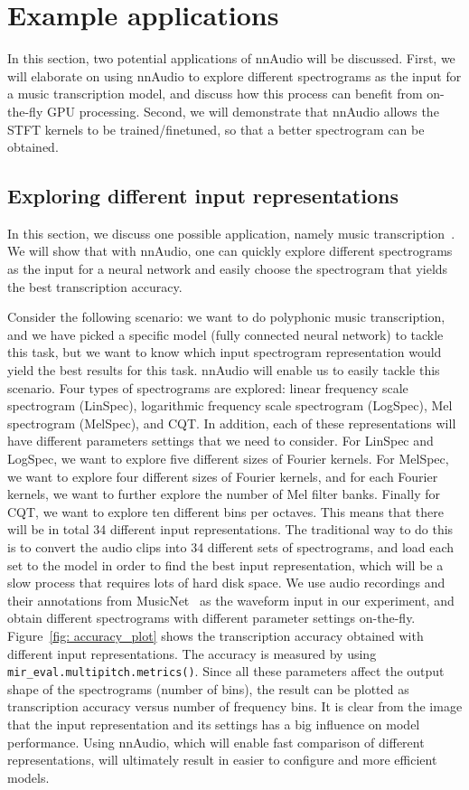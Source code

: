 \documentclass{ieeeaccess}
\newcommand{\nbh}[1]{\texttt{#1}}
\begin{document}
\section{Example applications}
In this section, two potential applications of nnAudio will be discussed. First, we will elaborate on using nnAudio to explore different spectrograms as the input for a music transcription model, and discuss how this process can benefit from on-the-fly GPU processing. Second, we will demonstrate that nnAudio allows the STFT kernels to be trained/finetuned, so that a better spectrogram can be obtained.


\subsection{Exploring different input representations}
In this section, we discuss one possible application, namely music transcription~\cite{benetos2013automatic, holzapfel2019automatic}. We will show that with nnAudio, one can quickly explore different spectrograms as the input for a neural network and easily choose the spectrogram that yields the best transcription accuracy.

Consider the following scenario: we want to do polyphonic music transcription, and we have picked a specific model (fully connected neural network) to tackle this task, but we want to know which input spectrogram representation would yield the best results for this task. nnAudio will enable us to easily tackle this scenario. Four types of spectrograms are explored: linear frequency scale spectrogram (LinSpec), logarithmic frequency scale spectrogram (LogSpec), Mel spectrogram (MelSpec), and CQT. In addition, each of these representations will have different parameters settings that we need to consider. For LinSpec and LogSpec, we want to explore five different sizes of Fourier kernels. For MelSpec, we want to explore four different sizes of Fourier kernels, and for each Fourier kernels, we want to further explore the number of Mel filter banks. Finally for CQT, we want to explore ten different bins per octaves. This means that there will be in total 34 different input representations. The traditional way to do this is to convert the audio clips into 34 different sets of spectrograms, and load each set to the model in order to find the best input representation, which will be a slow process that requires lots of hard disk space. We use audio recordings and their annotations from MusicNet~\cite{thickstun2017learning, thickstun2018invariances} as the waveform input in our experiment, and obtain different spectrograms with different parameter settings on-the-fly. Figure~\ref{fig: accuracy_plot} shows the transcription accuracy obtained with different input representations. The accuracy is measured by using \nbh{mir\_eval.multipitch.metrics()}. Since all these parameters affect the output shape of the spectrograms (number of bins), the result can be plotted as transcription accuracy versus number of frequency bins. It is clear from the image that the input representation and its settings has a big influence on model performance. Using nnAudio, which will enable fast comparison of different representations, will ultimately result in easier to configure and more efficient models. 
\end{document}
